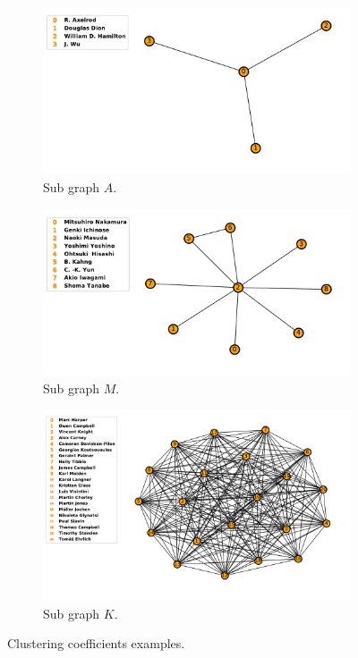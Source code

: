 \documentclass{article}
\begin{document}
\begin{center}
    \begin{figure}[!hbtp]
        \begin{subfigure}{0.33\textwidth}
            \includegraphics[width=\textwidth]{./assets/images/clustering_example_one.pdf}
            \caption{Sub graph \(A\).}
        \end{subfigure}
        \begin{subfigure}{0.33\textwidth}
            \includegraphics[width=\textwidth]{./assets/images/clustering_example_two.pdf}
            \caption{Sub graph \(M\).}
        \end{subfigure}
        \begin{subfigure}{0.33\textwidth}
            \includegraphics[width=\textwidth]{./assets/images/clustering_example_three.pdf}
            \caption{Sub graph \(K\).}
        \end{subfigure}
    \caption{Clustering coefficients examples.}
    \label{fig:clustering_coefficients}
    \end{figure}
    \end{center}
\end{document}
